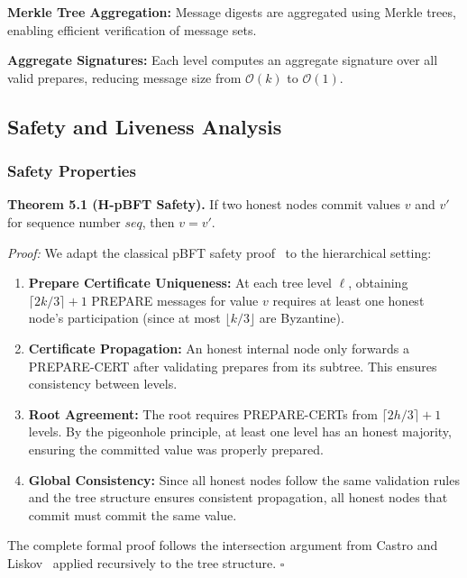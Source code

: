 \documentclass[conference]{IEEEtran}
\newcommand{\bigO}{\mathcal{O}}
\begin{document}
\textbf{Merkle Tree Aggregation:} Message digests are aggregated using Merkle trees, enabling efficient verification of message sets.

\textbf{Aggregate Signatures:} Each level computes an aggregate signature over all valid prepares, reducing message size from $\bigO(k)$ to $\bigO(1)$.

\subsection{Safety and Liveness Analysis}

\subsubsection{Safety Properties}

\textbf{Theorem 5.1 (H-pBFT Safety).} If two honest nodes commit values $v$ and $v'$ for sequence number $seq$, then $v = v'$.

\textit{Proof:} We adapt the classical pBFT safety proof~\cite{castro1999practical} to the hierarchical setting:

\begin{enumerate}
    \item \textbf{Prepare Certificate Uniqueness:} At each tree level $\ell$, obtaining $\lceil 2k/3 \rceil + 1$ PREPARE messages for value $v$ requires at least one honest node's participation (since at most $\lfloor k/3 \rfloor$ are Byzantine).
    
    \item \textbf{Certificate Propagation:} An honest internal node only forwards a PREPARE-CERT after validating prepares from its subtree. This ensures consistency between levels.
    
    \item \textbf{Root Agreement:} The root requires PREPARE-CERTs from $\lceil 2h/3 \rceil + 1$ levels. By the pigeonhole principle, at least one level has an honest majority, ensuring the committed value was properly prepared.
    
    \item \textbf{Global Consistency:} Since all honest nodes follow the same validation rules and the tree structure ensures consistent propagation, all honest nodes that commit must commit the same value.
\end{enumerate}

The complete formal proof follows the intersection argument from Castro and Liskov~\cite{castro1999practical} applied recursively to the tree structure. $\square$
\end{document}
